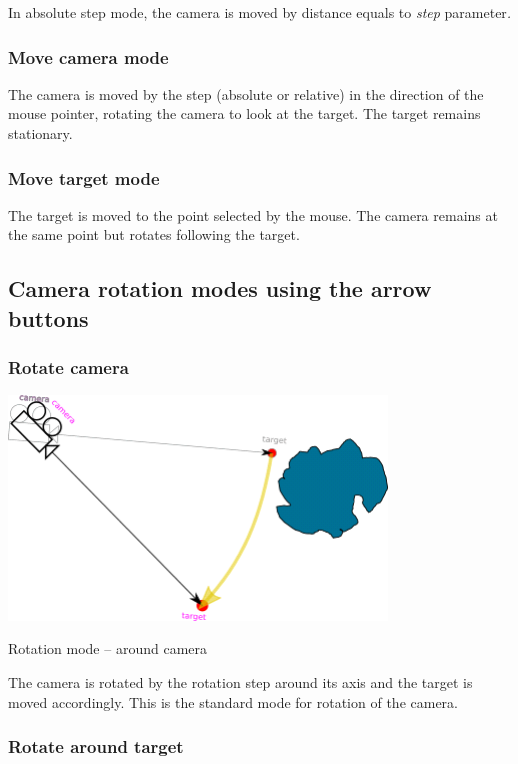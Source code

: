 In absolute step mode, the camera is moved by distance equals to
\emph{step} parameter\emph{.}

\subsubsection{Move camera mode}\label{move-camera-mode-1}

The camera is moved by the step (absolute or relative) in the direction
of the mouse pointer, rotating the camera to look at the target. The
target remains stationary.

\subsubsection{Move target mode}\label{move-target-mode-1}

The target is moved to the point selected by the mouse. The camera
remains at the same point but rotates following the target.

\subsection{Camera rotation modes using the arrow
buttons}\label{camera-rotation-modes-using-the-arrow-buttons}

\subsubsection{Rotate camera}\label{rotate-camera}

\includegraphics[width=3.95347in,height=2.34861in]{img/manual/media/image14.png}

Rotation mode -- around camera

The camera is rotated by the rotation step around its axis and the
target is moved accordingly. This is the standard mode for rotation of
the camera.

\subsubsection{Rotate around target}\label{rotate-around-target}

